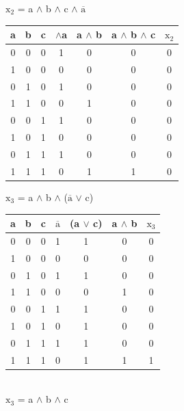 $\text{x}_2$ = a $\land$ b $\land$ c $\land$ $\overline{\text{a}}$ \\

\begin{tabular}{c|c|c|c||c||c||c}
	a & b & c & $\land$a & a $\land$ b & a $\land$ b $\land$ c & $\text{x}_2$ \\
	\hline
	0 & 0 & 0 & 1 & 0 & 0 & 0 \\
	1 & 0 & 0 & 0 & 0 & 0 & 0 \\
	0 & 1 & 0 & 1 & 0 & 0 & 0 \\
	1 & 1 & 0 & 0 & 1 & 0 & 0 \\
	0 & 0 & 1 & 1 & 0 & 0 & 0 \\
	1 & 0 & 1 & 0 & 0 & 0 & 0 \\
	0 & 1 & 1 & 1 & 0 & 0 & 0 \\
	1 & 1 & 1 & 0 & 1 & 1 & 0 \\
\end{tabular}

$\text{x}_3$ = a $\land$ b $\land$ ($\overline{\text{a}}$ $\lor$ c) \\

\begin{tabular}{c|c|c|c||c||c||c}
	a & b & c & $\overline{\text{a}}$ & (a $\lor$ c) & a $\land$ b & $\text{x}_3$ \\
	\hline
	0 & 0 & 0 & 1 & 1 & 0 & 0 \\
	1 & 0 & 0 & 0 & 0 & 0 & 0 \\
	0 & 1 & 0 & 1 & 1 & 0 & 0 \\
	1 & 1 & 0 & 0 & 0 & 1 & 0 \\
	0 & 0 & 1 & 1 & 1 & 0 & 0 \\
	1 & 0 & 1 & 0 & 1 & 0 & 0 \\
	0 & 1 & 1 & 1 & 1 & 0 & 0 \\
	1 & 1 & 1 & 0 & 1 & 1 & 1 \\
\end{tabular} \\
$\text{x}_3$ = a $\land$ b $\land$ c 

